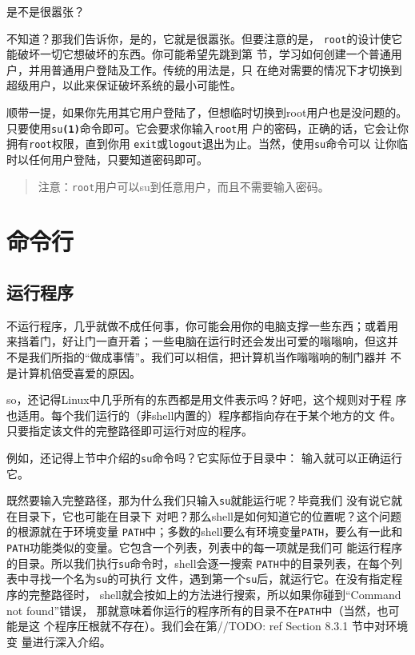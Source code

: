 是不是很嚣张？

不知道？那我们告诉你，是的，它就是很嚣张。但要注意的是，
\texttt{root}的设计使它能破坏一切它想破坏的东西。你可能希望先跳到第
节，学习如何创建一个普通用户，并用普通用户登陆及工作。传统的用法是，只
在绝对需要的情况下才切换到超级用户，以此来保证破坏系统的最小可能性。

顺带一提，如果你先用其它用户登陆了，但想临时切换到root用户也是没问题的。
只要使用\texttt{su\textbf{(1)}}命令即可。它会要求你输入\texttt{root}用
户的密码，正确的话，它会让你拥有\texttt{root}权限，直到你用
\texttt{exit}或\texttt{logout}退出为止。当然，使用\texttt{su}命令可以
让你临时以任何用户登陆，只要知道密码即可。

\begin{quote}
  注意：\texttt{root}用户可以su到任意用户，而且不需要输入密码。
\end{quote}


\section{命令行}
\label{sec:shell:commandLine}

\subsection{运行程序}
\label{sec:shell:commandLine:runningPrograms}
不运行程序，几乎就做不成任何事，你可能会用你的电脑支撑一些东西；或着用
来挡着门，好让门一直开着；一些电脑在运行时还会发出可爱的嗡嗡响，但这并
不是我们所指的``做成事情''。我们可以相信，把计算机当作嗡嗡响的制门器并
不是计算机倍受喜爱的原因。

so，还记得Linux中几乎所有的东西都是用文件表示吗？好吧，这个规则对于程
序也适用。每个我们运行的（非shell内置的）程序都指向存在于某个地方的文
件。只要指定该文件的完整路径即可运行对应的程序。

例如，还记得上节中介绍的\texttt{su}命令吗？它实际位于目录中：
输入就可以正确运行它。

既然要输入完整路径，那为什么我们只输入\texttt{su}就能运行呢？毕竟我们
没有说它就在目录下，它也可能在目录下
对吧？那么shell是如何知道它的位置呢？这个问题的根源就在于环境变量
\texttt{PATH}中；多数的shell要么有环境变量\texttt{PATH}，要么有一此和
\texttt{PATH}功能类似的变量。它包含一个列表，列表中的每一项就是我们可
能运行程序的目录。所以我们执行\texttt{su}命令时，shell会逐一搜索
\texttt{PATH}中的目录列表，在每个列表中寻找一个名为\texttt{su}的可执行
文件，遇到第一个\texttt{su}后，就运行它。在没有指定程序的完整路径时，
shell就会按如上的方法进行搜索，所以如果你碰到``Command not found''错误，
那就意味着你运行的程序所有的目录不在\texttt{PATH}中（当然，也可能是这
个程序圧根就不存在）。我们会在第//TODO: ref Section 8.3.1 节中对环境变
量进行深入介绍。

